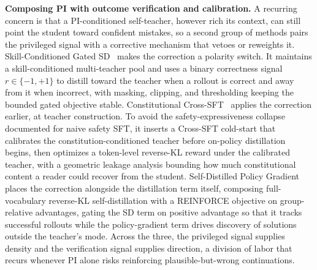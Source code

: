 \documentclass{article} %
\begin{document}
\textbf{Composing PI with outcome verification and calibration.} A recurring concern is that a PI-conditioned self-teacher, however rich its context, can still point the student toward confident mistakes, so a second group of methods pairs the privileged signal with a corrective mechanism that vetoes or reweights it. Skill-Conditioned Gated SD~\citep{2605.28791} makes the correction a polarity switch. It maintains a skill-conditioned multi-teacher pool and uses a binary correctness signal $r \in \{-1, +1\}$ to distill toward the teacher when a rollout is correct and away from it when incorrect, with masking, clipping, and thresholding keeping the bounded gated objective stable. Constitutional Cross-SFT~\citep{2606.03089} applies the correction earlier, at teacher construction. To avoid the safety-expressiveness collapse documented for naive safety SFT, it inserts a Cross-SFT cold-start that calibrates the constitution-conditioned teacher before on-policy distillation begins, then optimizes a token-level reverse-KL reward under the calibrated teacher, with a geometric leakage analysis bounding how much constitutional content a reader could recover from the student. Self-Distilled Policy Gradient~\citep{2606.04036} places the correction alongside the distillation term itself, composing full-vocabulary reverse-KL self-distillation with a REINFORCE objective on group-relative advantages, gating the SD term on positive advantage so that it tracks successful rollouts while the policy-gradient term drives discovery of solutions outside the teacher's mode. Across the three, the privileged signal supplies density and the verification signal supplies direction, a division of labor that recurs whenever PI alone risks reinforcing plausible-but-wrong continuations.
\end{document}

